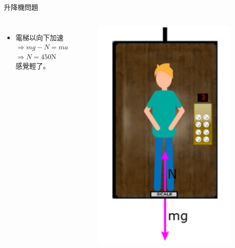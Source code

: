 \documentclass[beamer=true]{standalone}
\begin{document}
\begin{frame}{升降機問題}
\begin{columns}
\begin{itemize}
            \item 電梯以向下加速 \\$\Rightarrow mg-N=ma$\\$\Rightarrow N=450$N\\感覺輕了。
        \end{itemize}
        \begin{figure}[h!]
            \centering
            \includegraphics[width=\textwidth]{assets/6596ff5b.png}
        \end{figure}
    \end{columns}
\end{frame}
\end{document}
